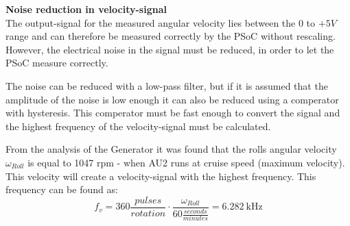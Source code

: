 \textbf{Noise reduction in velocity-signal}\\
The output-signal for the measured angular velocity lies between the $0$ to $+5 V$ range and can therefore be measured correctly by the PSoC without rescaling. However, the electrical noise in the signal must be reduced, in order to let the PSoC measure correctly.

The noise can be reduced with a low-pass filter, but if it is assumed that the amplitude of the noise is low enough it can also be reduced using a comperator with hysteresis. This comperator must be fast enough to convert the signal and the highest frequency of the velocity-signal must be calculated.

From the analysis of the Generator it was found that the rolls angular velocity $\omega_{Roll}$ is equal to 1047 rpm - when AU2 runs at cruise speed (maximum velocity). This velocity will create a velocity-signal with the highest frequency. This frequency can be found as:
\begin{equation}
	f_{v} = 360 \frac{pulses}{rotation} \cdot \frac{\omega_{Roll}}{60\frac{seconds}{minutes}} = \SI{6.282}{\kilo \hertz}
\end{equation}
